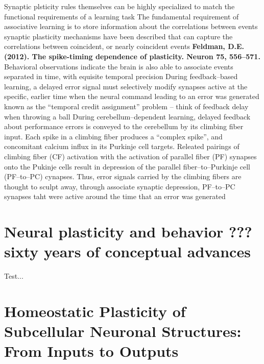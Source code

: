 \documentclass[11pt, a4paper, oneside]{article}   	%
\begin{document}
\begin{outline}
    \point Synaptic plsticity rules themselves can be highly specialized to match the functional requirements of a learning task
    \point The fundamental requirement of associative learning is to store information about the correlations between events
        \subpoint synaptic plasticity mechanisms have been described that can capture the correlations between coincident, or nearly coincident events
           \subsubpoint \textbf{Feldman, D.E. (2012). The spike-timing dependence of plasticity. Neuron 75, 556–571.}
        \subpoint Behavioral observations indicate the brain is also able to associate events separated in time, with equisite temporal precision
            \subsubpoint During feedback--based learning, a delayed error signal must selectively modify synapses active at the specific, earlier time when the neural command leading to an error was generated
            \supersubpoint known as the ``temporal credit assignment'' problem -- think of feedback delay when throwing a ball
    \point During cerebellum--dependent learning, delayed feedback about performance errors is conveyed to the cerebellum by its climbing fiber input.
        \subpoint Each spike in a climbing fiber produces a ``complex spike'', and concomitant calcium influx in its Purkinje cell targets. Releated pairings of climbing fiber (CF) activation with the activation of parallel fiber (PF) synapses onto the Pukinje cells result in depression of the parallel fiber--to--Purkinje cell (PF--to--PC) cynapses.
            \subsubpoint Thus, error signals carried by the climbing fibers are thought to sculpt away, through associate synaptic depression, PF--to--PC synapses taht were active around the time that an error was generated

    
\end{outline}






\section{Neural plasticity and behavior ??? sixty years of conceptual advances \cite{Sweatt2016}}

Test...

\section{Homeostatic Plasticity of Subcellular Neuronal Structures: From Inputs to Outputs \cite{Wefelmeyer2016}}
\end{document}
